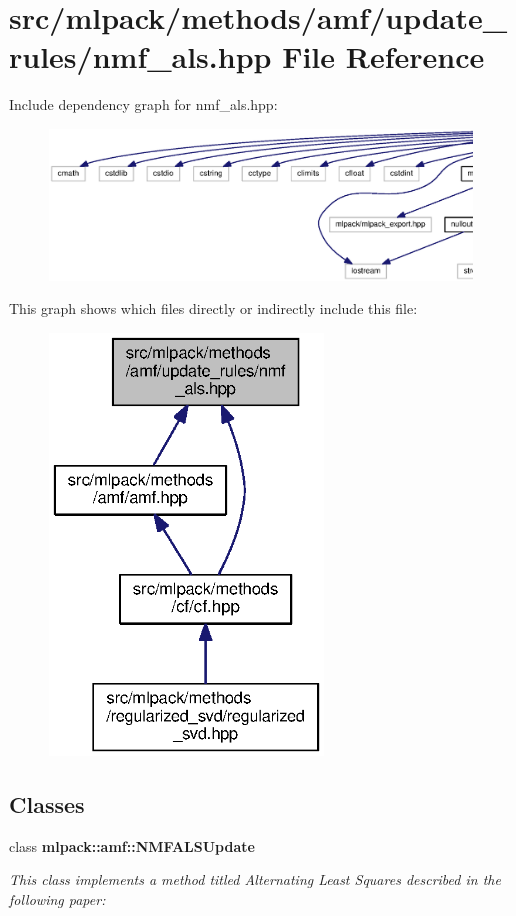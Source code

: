 \section{src/mlpack/methods/amf/update\+\_\+rules/nmf\+\_\+als.hpp File Reference}
\label{nmf__als_8hpp}
Include dependency graph for nmf\+\_\+als.\+hpp\+:
\nopagebreak
\begin{figure}[H]
\begin{center}
\leavevmode
\includegraphics[width=350pt]{nmf__als_8hpp__incl}
\end{center}
\end{figure}
This graph shows which files directly or indirectly include this file\+:
\nopagebreak
\begin{figure}[H]
\begin{center}
\leavevmode
\includegraphics[width=206pt]{nmf__als_8hpp__dep__incl}
\end{center}
\end{figure}
\subsection*{Classes}
\begin{DoxyCompactItemize}
\item 
class {\bf mlpack\+::amf\+::\+N\+M\+F\+A\+L\+S\+Update}
\begin{DoxyCompactList}\small\item\em This class implements a method titled \textquotesingle{}Alternating Least Squares\textquotesingle{} described in the following paper\+: \end{DoxyCompactList}\end{DoxyCompactItemize}

